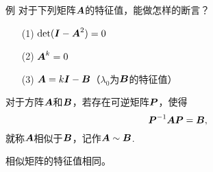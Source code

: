 

        \begin{frame}
          
          \begin{li}{例}
            对于下列矩阵$\boldsymbol{A}$的特征值，能做怎样的断言？
            \begin{itemize}
            \item[(1)] $\mathrm{det}(\boldsymbol{I}-\boldsymbol{A}^2)=0$
            \item[(2)] $\boldsymbol{A}^k=0$
            \item[(3)] $\boldsymbol{A}=k\boldsymbol{I}-\boldsymbol{B}$（$\lambda_0$为$\boldsymbol{B}$的特征值）
            \end{itemize}
          \end{li}
          
        \end{frame}


        \begin{frame}
          
          \begin{dingyi}[相似矩阵]
            对于方阵$\boldsymbol{A}$和$\boldsymbol{B}$，若存在可逆矩阵$\boldsymbol{P}$，使得
            $$
            \boldsymbol{P}^{-1}\boldsymbol{A}\boldsymbol{P}=\boldsymbol{B},
            $$
            就称$\boldsymbol{A}$相似于$\boldsymbol{B}$，记作$\boldsymbol{A}\sim\boldsymbol{B}$.
          \end{dingyi}
          

          \begin{dingli}
            相似矩阵的特征值相同。
          \end{dingli}
          
          
        \end{frame}



